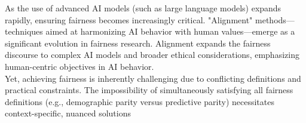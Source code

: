 As the use of advanced AI models (such as large language models) expands rapidly, ensuring fairness becomes
increasingly critical. "Alignment" methods—techniques aimed at harmonizing AI behavior with human values—emerge
as a significant evolution in fairness research. Alignment expands the fairness discourse to complex AI models
and broader ethical considerations, emphasizing human-centric objectives in AI behavior. \\

Yet, achieving fairness is inherently challenging due to conflicting definitions and practical constraints.
The impossibility of simultaneously satisfying all fairness definitions
(e.g., demographic parity versus predictive parity) necessitates context-specific, nuanced solutions
